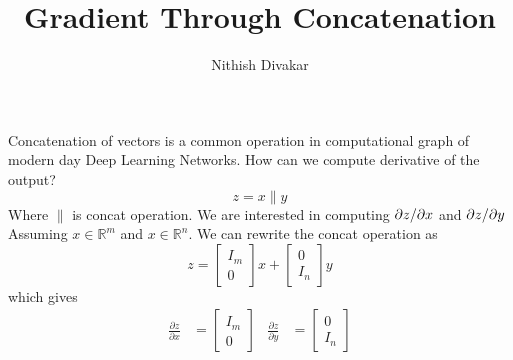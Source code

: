 \documentclass[12pt,crop=false,class=article,convert={density=300,outext=.compiled.png}]{standalone}
\title{\Huge Gradient Through Concatenation}
\date{}
\author{Nithish Divakar}
\begin{document}
\maketitle

Concatenation of vectors is a common operation in computational graph of modern day Deep Learning Networks. How can we compute derivative of the output?
%
$$ z = x\|y$$
%
Where $\|$ is concat operation. We are interested in computing ${\partial z}/{\partial x}$ and ${\partial z}/{\partial y} $
%
Assuming $x\in \mathbb{R}^m$ and $x\in \mathbb{R}^n$. We can rewrite the concat operation as
%
$$z = \begin{bmatrix}I_m\\0\end{bmatrix}x+\begin{bmatrix}0\\I_n\end{bmatrix}y$$
%
which gives
%
\begin{align*}
\frac{\partial z}{\partial x} &= \begin{bmatrix}I_m\\0\end{bmatrix}
&
\frac{\partial z}{\partial y} &= \begin{bmatrix}0\\ I_n\end{bmatrix}
\end{align*}
\end{document}
